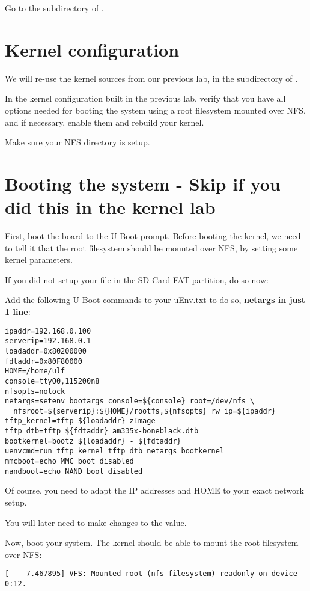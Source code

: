 Go to the  subdirectory of \labdir.

\section{Kernel configuration}

We will re-use the kernel sources from our previous lab, in
the  subdirectory of \labdir.

In the kernel configuration built in the previous lab, verify that you
have all options needed for booting the system using a root filesystem
mounted over NFS, and if necessary, enable them and rebuild your
kernel.

Make sure your NFS directory is setup.
\clearpage
\section{Booting the system - Skip if you did this in the kernel lab}

First, boot the board to the U-Boot prompt. Before booting the kernel,
we need to tell it that the root filesystem should be mounted over
NFS, by setting some kernel parameters.

If you did not setup your  file in the SD-Card FAT partition,
do so now:

Add the following U-Boot commands to your uEnv.txt to do so, {\bf netargs in just 1 line}:

\begin{verbatim}
ipaddr=192.168.0.100
serverip=192.168.0.1
loadaddr=0x80200000
fdtaddr=0x80F80000
HOME=/home/ulf
console=ttyO0,115200n8
nfsopts=nolock
netargs=setenv bootargs console=${console} root=/dev/nfs \
  nfsroot=${serverip}:${HOME}/rootfs,${nfsopts} rw ip=${ipaddr}
tftp_kernel=tftp ${loadaddr} zImage
tftp_dtb=tftp ${fdtaddr} am335x-boneblack.dtb
bootkernel=bootz ${loadaddr} - ${fdtaddr}
uenvcmd=run tftp_kernel tftp_dtb netargs bootkernel
mmcboot=echo MMC boot disabled
nandboot=echo NAND boot disabled
\end{verbatim}

Of course, you need to adapt the IP addresses and HOME to your exact network
setup.

You will later need to make changes to the  value.

Now, boot your system. The kernel should be able to mount the root
filesystem over NFS:

\begin{verbatim}
[    7.467895] VFS: Mounted root (nfs filesystem) readonly on device 0:12.
\end{verbatim}

